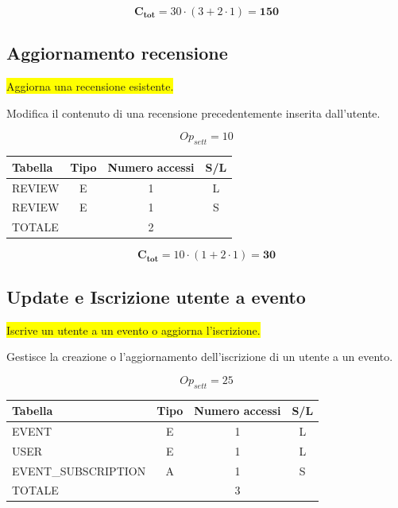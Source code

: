 \documentclass[a4paper,12pt]{report}
\begin{document}
$$\mathbf{C_{tot}} = 30 \cdot (3 + 2 \cdot 1) = \mathbf{150}$$

\subsection*{Aggiornamento recensione} \label{op11}
\colorbox{yellow}{Aggiorna una recensione esistente.}

Modifica il contenuto di una recensione precedentemente inserita dall'utente.

$$Op_{sett} = 10$$

\begin{table}[H]
  \centering
  \small
  \renewcommand{\arraystretch}{1.15}
  \begin{tabularx}{0.8\textwidth}{|X|c|c|c|}
    \hline
    \rowcolor{gray!20}
    \textbf{Tabella} & \textbf{Tipo} & \textbf{Numero accessi} & \textbf{S/L} \\
    \hline
    REVIEW & E & 1 & L \\
    REVIEW & E & 1 & S \\
    \hline
    \rowcolor{gray!20}
    TOTALE & & 2 & \\
    \hline
  \end{tabularx}
  \vspace{-1em}
\end{table}

$$\mathbf{C_{tot}} = 10 \cdot (1 + 2 \cdot 1) = \mathbf{30}$$

\subsection*{Update e Iscrizione utente a evento} \label{op12}
\colorbox{yellow}{Iscrive un utente a un evento o aggiorna l'iscrizione.}

Gestisce la creazione o l'aggiornamento dell'iscrizione di un utente
a un evento.

$$Op_{sett} = 25$$

\begin{table}[H]
  \centering
  \small
  \renewcommand{\arraystretch}{1.15}
  \begin{tabularx}{0.8\textwidth}{|X|c|c|c|}
    \hline
    \rowcolor{gray!20}
    \textbf{Tabella} & \textbf{Tipo} & \textbf{Numero accessi} & \textbf{S/L} \\
    \hline
    EVENT & E & 1 & L \\
    USER & E & 1 & L \\
    EVENT\_SUBSCRIPTION & A & 1 & S \\
    \hline
    \rowcolor{gray!20}
    TOTALE & & 3 & \\
    \hline
  \end{tabularx}
  \vspace{-1em}
\end{table}
\end{document}

